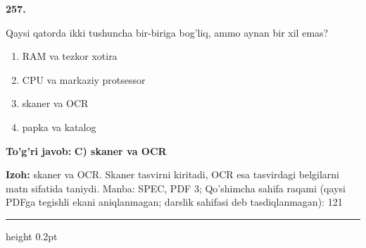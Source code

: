 \documentclass[10pt,a4paper]{article}
\begin{document}
{\bfseries\sffamily\color{ink} 257.}
\par
Qaysi qatorda ikki tushuncha bir-biriga bog'liq, ammo aynan bir xil emas?
\begin{enumerate}[label=\Alph*),leftmargin=9mm]
\item RAM va tezkor xotira
\item CPU va markaziy protsessor
\item skaner va OCR
\item papka va katalog
\end{enumerate}
\begin{tcolorbox}[enhanced,breakable,colback=teal!4,colframe=teal!60!black,boxrule=0.45pt,arc=1.2mm,left=2.7mm,right=2.7mm,top=1.8mm,bottom=1.8mm,before skip=2mm,after skip=2mm]
{\bfseries\sffamily\color{teal}To'g'ri javob:} \textbf{C) skaner va OCR}
\par\smallskip
{\bfseries Izoh:} skaner va OCR. Skaner tasvirni kiritadi, OCR esa tasvirdagi belgilarni matn sifatida taniydi. Manba: SPEC, PDF 3; Qo'shimcha sahifa raqami (qaysi PDFga tegishli ekani aniqlanmagan; darslik sahifasi deb tasdiqlanmagan): 121
\end{tcolorbox}
\vspace{2mm}\hrule height 0.2pt\vspace{3mm}
\end{document}
